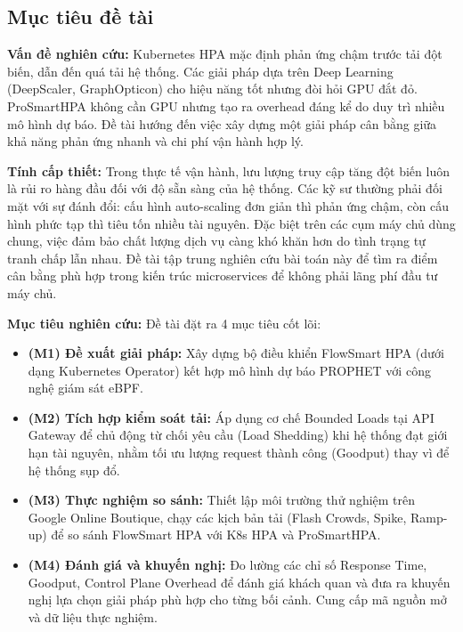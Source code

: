 \documentclass[14pt]{article}
\begin{document}
\subsection{Mục tiêu đề tài}

\noindent\textbf{Vấn đề nghiên cứu:} Kubernetes HPA mặc định phản ứng chậm trước tải đột biến, dẫn đến quá tải hệ thống. Các giải pháp dựa trên Deep Learning (DeepScaler, GraphOpticon) cho hiệu năng tốt nhưng đòi hỏi GPU đắt đỏ. ProSmartHPA không cần GPU nhưng tạo ra overhead đáng kể do duy trì nhiều mô hình dự báo. Đề tài hướng đến việc xây dựng một giải pháp cân bằng giữa khả năng phản ứng nhanh và chi phí vận hành hợp lý.

\noindent\textbf{Tính cấp thiết:} Trong thực tế vận hành, lưu lượng truy cập tăng đột biến luôn là rủi ro hàng đầu đối với độ sẵn sàng của hệ thống. Các kỹ sư thường phải đối mặt với sự đánh đổi: cấu hình auto-scaling đơn giản thì phản ứng chậm, còn cấu hình phức tạp thì tiêu tốn nhiều tài nguyên. Đặc biệt trên các cụm máy chủ dùng chung, việc đảm bảo chất lượng dịch vụ càng khó khăn hơn do tình trạng tự tranh chấp lẫn nhau. Đề tài tập trung nghiên cứu bài toán này để tìm ra điểm cân bằng phù hợp trong kiến trúc microservices để không phải lãng phí đầu tư máy chủ.

\noindent\textbf{Mục tiêu nghiên cứu:} Đề tài đặt ra 4 mục tiêu cốt lõi:
\begin{itemize}[leftmargin=1.5cm, label=\textbullet]
    \item \textbf{(M1) Đề xuất giải pháp:} Xây dựng bộ điều khiển FlowSmart HPA (dưới dạng Kubernetes Operator) kết hợp mô hình dự báo PROPHET với công nghệ giám sát eBPF.
    \item \textbf{(M2) Tích hợp kiểm soát tải:} Áp dụng cơ chế Bounded Loads tại API Gateway để chủ động từ chối yêu cầu (Load Shedding) khi hệ thống đạt giới hạn tài nguyên, nhằm tối ưu lượng request thành công (Goodput) thay vì để hệ thống sụp đổ.
    \item \textbf{(M3) Thực nghiệm so sánh:} Thiết lập môi trường thử nghiệm trên Google Online Boutique, chạy các kịch bản tải (Flash Crowds, Spike, Ramp-up) để so sánh FlowSmart HPA với K8s HPA và ProSmartHPA.
    \item \textbf{(M4) Đánh giá và khuyến nghị:} Đo lường các chỉ số Response Time, Goodput, Control Plane Overhead để đánh giá khách quan và đưa ra khuyến nghị lựa chọn giải pháp phù hợp cho từng bối cảnh. Cung cấp mã nguồn mở và dữ liệu thực nghiệm.
\end{itemize}
\end{document}
